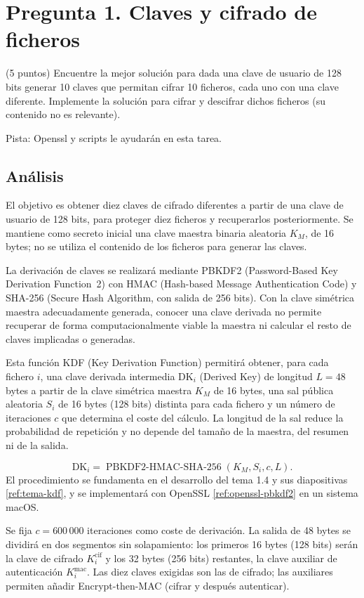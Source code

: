 \section{Pregunta 1. Claves y cifrado de ficheros}
\label{sec:pregunta1}

\begin{enunciado}{(5 puntos)}
Encuentre la mejor solución para dada una clave de usuario de 128 bits generar 10 claves que permitan cifrar 10 ficheros, cada uno con una clave diferente. Implemente la solución para cifrar y descifrar dichos ficheros (su contenido no es relevante).

Pista: Openssl y scripts le ayudarán en esta tarea.
\end{enunciado}

\subsection{Análisis}

El objetivo es obtener diez claves de cifrado diferentes a partir de una clave de usuario de 128 bits, para proteger diez ficheros y recuperarlos posteriormente. Se mantiene como secreto inicial una clave maestra binaria aleatoria $K_M$, de 16 bytes; no se utiliza el contenido de los ficheros para generar las claves.

La derivación de claves se realizará mediante PBKDF2 (Password-Based Key Derivation Function~2) con HMAC (Hash-based Message Authentication Code) y SHA-256 (Secure Hash Algorithm, con salida de 256 bits).
Con la clave simétrica maestra adecuadamente generada, conocer una clave derivada no permite recuperar de forma computacionalmente viable la maestra ni calcular el resto de claves implicadas o generadas.

Esta función KDF (Key Derivation Function) permitirá obtener, para cada fichero $i$, una clave derivada intermedia $\mathrm{DK}_i$ (Derived Key) de longitud $L=48$ bytes a partir de la clave simétrica maestra $K_M$ de 16 bytes, una sal pública aleatoria $S_i$ de 16 bytes (128 bits) distinta para cada fichero y un número de iteraciones $c$ que determina el coste del cálculo. La longitud de la sal reduce la probabilidad de repetición y no depende del tamaño de la maestra, del resumen ni de la salida.

\begin{samepage}
\[
  \mathrm{DK}_i=\operatorname{PBKDF2\text{-}HMAC\text{-}SHA\text{-}256}
  (K_M,S_i,c,L).
\]
El procedimiento se fundamenta en el desarrollo del tema 1.4 y sus diapositivas \ref{ref:tema-kdf}, y se implementará con OpenSSL \ref{ref:openssl-pbkdf2} en un sistema macOS.
\end{samepage}
Se fija $c=600\,000$ iteraciones como coste de derivación. La salida de 48 bytes se dividirá en dos segmentos sin solapamiento: los primeros 16 bytes (128 bits) serán la clave de cifrado $K_i^{\mathrm{cif}}$ y los 32 bytes (256 bits) restantes, la clave auxiliar de autenticación $K_i^{\mathrm{mac}}$. Las diez claves exigidas son las de cifrado; las auxiliares permiten añadir Encrypt-then-MAC (cifrar y después autenticar).


